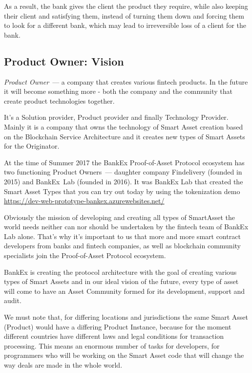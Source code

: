 \documentclass{article}
\begin{document}
\begin{multicols}{2}
As a result, the bank gives the client the product they require, while also keeping their client and satisfying them, instead of turning them down and forcing them to look for a different bank, which may lead to irreversible loss of a client for the bank.

\subsection{Product Owner: Vision}

\textit{Product Owner}~--- a company that creates various fintech products. In the future it will become something more - both the company and the community that create product technologies together.

It's a Solution provider, Product provider and finally Technology Provider. 
Mainly it is a company that owns the technology of Smart Asset creation based on the Blockchain Service Architecture and it creates new types of Smart Assets for the Originator.

At the time of Summer 2017 the BankEx Proof-of-Asset Protocol ecosystem has two functioning Product Owners~--- daughter company Findelivery (founded in 2015) and BankEx~Lab (founded in 2016). It was BankEx Lab that created the Smart Asset Types that you can try out today by using the tokenization demo \url{https://dev-web-prototype-bankex.azurewebsites.net/}

Obviously the mission of developing and creating all types of SmartAsset the world needs neither can nor should be undertaken by the fintech team of BankEx Lab alone. That’s why it’s important to us that more and more smart contract developers from banks and fintech companies, as well as blockchain community specialists join the Proof-of-Asset Protocol ecosystem.

BankEx is creating the protocol architecture with the goal of creating various types of Smart Assets and in our ideal vision of the future, every type of asset will come to have an Asset Community formed for its development, support and audit.

We must note that, for differing locations and jurisdictions the same Smart Asset (Product) would have a differing Product Instance, because for the moment different countries have different laws and legal conditions for transaction processing. This means an enormous number of tasks for developers, for programmers who will be working on the Smart Asset code that will change the way deals are made in the whole world.


\end{multicols}
\end{document}
